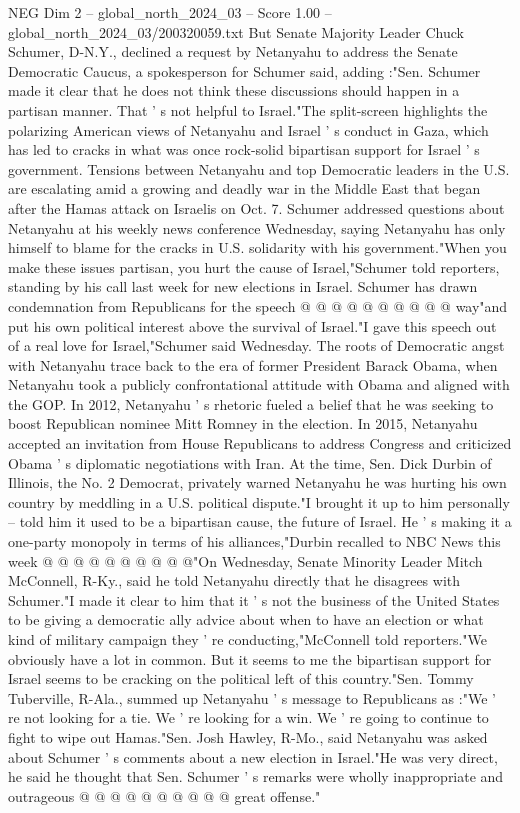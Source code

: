 \begin{textsample}{NEG Dim 2 – global\_north\_2024\_03 – Score 1.00 – global\_north\_2024\_03/200320059.txt}  \label{ex:f2_neg_346}
But Senate Majority Leader Chuck Schumer, D-N.Y., declined a request by Netanyahu to address the Senate Democratic Caucus, a spokesperson for Schumer said, adding :"Sen.
Schumer made it clear that he does not think these discussions should happen in a partisan manner.
That ' s not helpful to Israel."The split-screen highlights the polarizing American views of Netanyahu and Israel ' s conduct in Gaza, which has led to cracks in what was once rock-solid bipartisan support for Israel ' s government.
Tensions between Netanyahu and top Democratic leaders in the U.S. are escalating amid a growing and deadly war in the Middle East that began after the Hamas attack on Israelis on Oct. 7.
Schumer addressed questions about Netanyahu at his weekly news conference Wednesday, saying Netanyahu has only himself to blame for the cracks in U.S. solidarity with his government."When you make these issues partisan, you hurt the cause of Israel,"Schumer told reporters, standing by his call last week for new elections in Israel.
Schumer has drawn condemnation from Republicans for the speech @ @ @ @ @ @ @ @ @ @ way"and put his own political interest above the survival of Israel."I gave this speech out of a real love for Israel,"Schumer said Wednesday.
The roots of Democratic angst with Netanyahu trace back to the era of former President Barack Obama, when Netanyahu took a publicly confrontational attitude with Obama and aligned with the GOP.
In 2012, Netanyahu ' s rhetoric fueled a belief that he was seeking to boost Republican nominee Mitt Romney in the election.
In 2015, Netanyahu accepted an invitation from House Republicans to address Congress and criticized Obama ' s diplomatic negotiations with Iran.
At the time, Sen.
Dick Durbin of Illinois, the No. 2 Democrat, privately warned Netanyahu he was hurting his own country by meddling in a U.S. political dispute."I brought it up to him personally -- told him it used to be a bipartisan cause, the future of Israel.
He ' s making it a one-party monopoly in terms of his alliances,"Durbin recalled to NBC News this week @ @ @ @ @ @ @ @ @ @"On Wednesday, Senate Minority Leader Mitch McConnell, R-Ky., said he told Netanyahu directly that he disagrees with Schumer."I made it clear to him that it ' s not the business of the United States to be giving a democratic ally advice about when to have an election or what kind of military campaign they ' re conducting,"McConnell told reporters."We obviously have a lot in common.
But it seems to me the bipartisan support for Israel seems to be cracking on the political left of this country."Sen.
Tommy Tuberville, R-Ala., summed up Netanyahu ' s message to Republicans as :"We ' re not looking for a tie.
We ' re looking for a win.
We ' re going to continue to fight to wipe out Hamas."Sen.
Josh Hawley, R-Mo., said Netanyahu was asked about Schumer ' s comments about a new election in Israel."He was very direct, he said he thought that Sen.
Schumer ' s remarks were wholly inappropriate and outrageous @ @ @ @ @ @ @ @ @ @ great offense."

\end{textsample}
